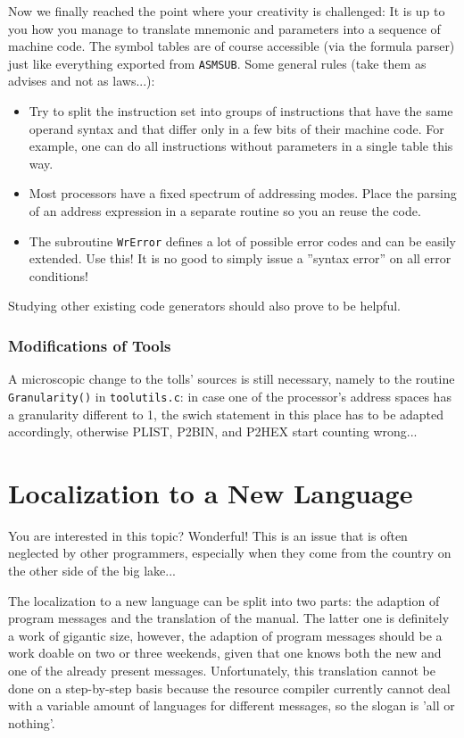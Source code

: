 \documentclass[12pt,twoside]{report}
\newcommand{\tty}[1]{{\tt #1}}
\begin{document}
Now we finally reached the point where your creativity is challenged:
It is up to you how you manage to translate mnemonic and parameters
into a sequence of machine code.  The symbol tables are of course
accessible (via the formula parser) just like everything exported
from \tty{ASMSUB}.  Some general rules (take them as advises and not as
laws...):
\begin{itemize}
\item{Try to split the instruction set into groups of instructions that
      have the same operand syntax and that differ only in a few bits
      of their machine code.  For example, one can do all instructions
      without parameters in a single table this way.}
\item{Most processors have a fixed spectrum of addressing modes.  Place
      the parsing of an address expression in a separate routine so you
      an reuse the code.}
\item{The subroutine \tty{WrError} defines a lot of possible error codes and
      can be easily extended.  Use this!  It is no good to simply issue
      a ''syntax error'' on all error conditions!}
\end{itemize}
Studying other existing code generators should also prove to be
helpful.

\subsubsection{Modifications of Tools}

A microscopic change to the tolls' sources is still necessary, namely to
the routine {\tt Granularity()} in {\tt toolutils.c}: in case one of the
processor's address spaces has a granularity different to 1, the swich
statement in this place has to be adapted accordingly, otherwise PLIST,
P2BIN, and P2HEX start counting wrong...

\section{Localization to a New Language}

You are interested in this topic?  Wonderful!  This is an issue that is
often neglected by other programmers, especially when they come from the
country on the other side of the big lake...

The localization to a new language can be split into two parts: the
adaption of program messages and the translation of the manual.  The
latter one is definitely a work of gigantic size, however, the adaption of
program messages should be a work doable on two or three weekends, given
that one knows both the new and one of the already present messages.
Unfortunately, this translation cannot be done on a step-by-step basis
because the resource compiler currently cannot deal with a variable amount
of languages for different messages, so the slogan is 'all or nothing'.
\end{document}
